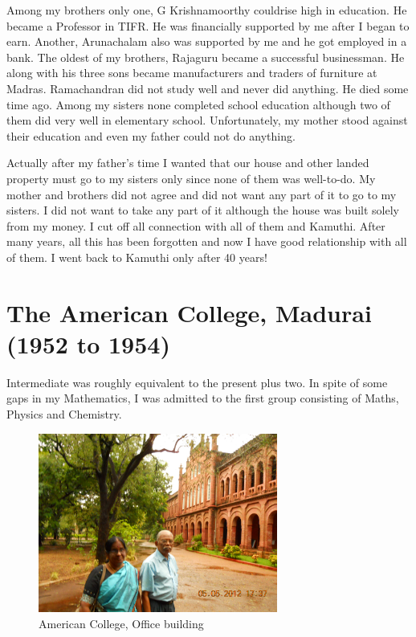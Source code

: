 Among my brothers only one, G Krishnamoorthy could\break rise high in 
education. He became a Professor in TIFR. He was financially supported 
by me after I began to earn. Another, Arunachalam also was supported by 
me and he got employed in a bank. The oldest of my brothers, Rajaguru 
became a successful businessman. He along with his three sons became 
manufacturers and traders of furniture at Madras. Ramachandran did not 
study well and never did anything. He died some time ago. Among my 
sisters none completed school education although two of them did very 
well in elementary school. Unfortunately, my mother stood against their 
education and even my father could not do anything.


Actually after my father's time I wanted that our house and other landed 
property must go to my sisters only since none of them was well-to-do.  
My mother and brothers did not agree and did not want any part of it to 
go to my sisters. I did not want to take any part of it although the 
house was built solely from my money. I cut off all connection with all 
of them and Kamuthi. After many years, all this has been forgotten and 
now I have good relationship with all of them. I went back to Kamuthi 
only after 40 years!
 
\section*{The American College, Madurai (1952 to 1954)}

Intermediate was roughly equivalent to the present plus two. In spite of 
some gaps in my Mathematics, I was admitted to the first group 
consisting of Maths, Physics and Chemistry.
\smallskip

\begin{figure}[H]
\centering
\includegraphics[width=0.7\textwidth]{images/new-images/05-Rajaji-AC.jpg}
\caption{American College, Office building}
\end{figure}

